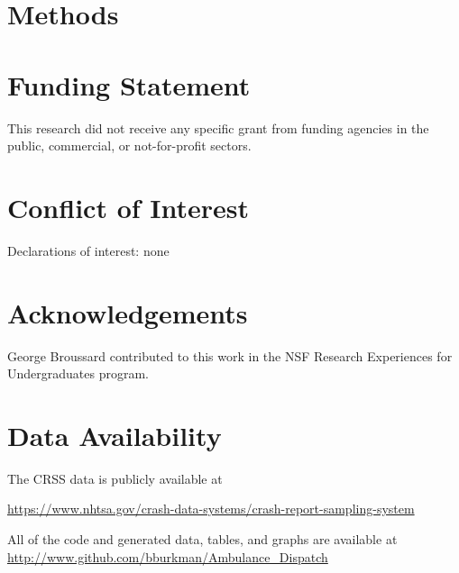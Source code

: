 \documentclass[fleqn]{cas-sc}
\begin{document}




\section{Methods}\label{sec:Methods}

%















\section*{Funding Statement}

This research did not receive any specific grant from funding agencies in the public, commercial, or not-for-profit sectors.

\section*{Conflict of Interest}

Declarations of interest: none

\section*{Acknowledgements}

George Broussard 
contributed to this work in the 
NSF Research Experiences for Undergraduates program.

\section*{Data Availability}

The CRSS data is publicly available at 

\url{https://www.nhtsa.gov/crash-data-systems/crash-report-sampling-system}

All of the code and generated data, tables, and graphs are available at 
\url{http://www.github.com/bburkman/Ambulance_Dispatch}
\end{document}
